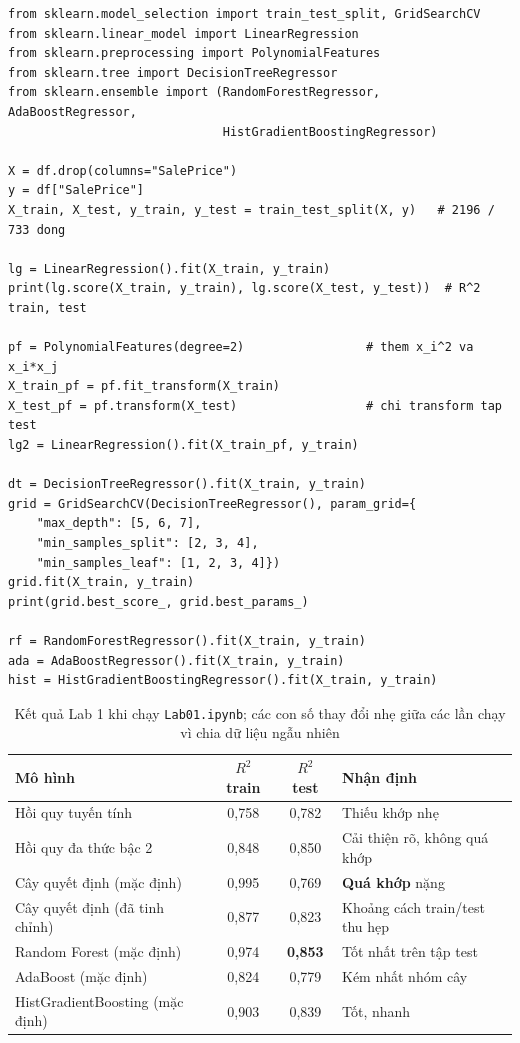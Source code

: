 \begin{lstlisting}[caption={Lab 1 -- huấn luyện các mô hình}]
from sklearn.model_selection import train_test_split, GridSearchCV
from sklearn.linear_model import LinearRegression
from sklearn.preprocessing import PolynomialFeatures
from sklearn.tree import DecisionTreeRegressor
from sklearn.ensemble import (RandomForestRegressor, AdaBoostRegressor,
                              HistGradientBoostingRegressor)

X = df.drop(columns="SalePrice")
y = df["SalePrice"]
X_train, X_test, y_train, y_test = train_test_split(X, y)   # 2196 / 733 dong

lg = LinearRegression().fit(X_train, y_train)
print(lg.score(X_train, y_train), lg.score(X_test, y_test))  # R^2 train, test

pf = PolynomialFeatures(degree=2)                 # them x_i^2 va x_i*x_j
X_train_pf = pf.fit_transform(X_train)
X_test_pf = pf.transform(X_test)                  # chi transform tap test
lg2 = LinearRegression().fit(X_train_pf, y_train)

dt = DecisionTreeRegressor().fit(X_train, y_train)
grid = GridSearchCV(DecisionTreeRegressor(), param_grid={
    "max_depth": [5, 6, 7],
    "min_samples_split": [2, 3, 4],
    "min_samples_leaf": [1, 2, 3, 4]})
grid.fit(X_train, y_train)
print(grid.best_score_, grid.best_params_)

rf = RandomForestRegressor().fit(X_train, y_train)
ada = AdaBoostRegressor().fit(X_train, y_train)
hist = HistGradientBoostingRegressor().fit(X_train, y_train)
\end{lstlisting}

\begin{table}[H]
\centering
\begin{tabular}{|l|c|c|l|}
\hline
\textbf{Mô hình} & \textbf{$R^2$ train} & \textbf{$R^2$ test} & \textbf{Nhận định} \\
\hline
Hồi quy tuyến tính & 0,758 & 0,782 & Thiếu khớp nhẹ \\ \hline
Hồi quy đa thức bậc 2 & 0,848 & 0,850 & Cải thiện rõ, không quá khớp \\ \hline
Cây quyết định (mặc định) & 0,995 & 0,769 & \textbf{Quá khớp} nặng \\ \hline
Cây quyết định (đã tinh chỉnh) & 0,877 & 0,823 & Khoảng cách train/test thu hẹp \\ \hline
Random Forest (mặc định) & 0,974 & \textbf{0,853} & Tốt nhất trên tập test \\ \hline
AdaBoost (mặc định) & 0,824 & 0,779 & Kém nhất nhóm cây \\ \hline
HistGradientBoosting (mặc định) & 0,903 & 0,839 & Tốt, nhanh \\ \hline
\end{tabular}
\caption{Kết quả Lab 1 khi chạy \texttt{Lab01.ipynb}; các con số thay đổi nhẹ giữa các lần chạy vì chia dữ liệu ngẫu nhiên}
\label{tab:lab-ames-r2}
\end{table}

